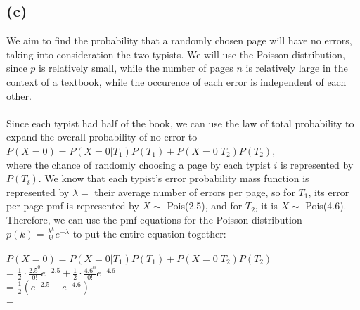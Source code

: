 \documentclass{article}
\begin{document}
{\subsection*{(c)}
We aim to find the probability that a randomly chosen page will have no errors, taking into consideration the two typists. We will use the Poisson distribution, since $p$ is relatively small, while the number of pages $n$ is relatively large in the context of a textbook, while the occurence of each error is independent of each other. \\ \\ 
Since each typist had half of the book, we can use the law of total probability to expand the overall probability of no error to \\ 
$P(X = 0) = P(X = 0 | T_1)P(T_1) + P(X = 0 | T_2)P(T_2)$, \\  where the chance of randomly choosing a page by each typist $i$ is represented by $P(T_i)$. We know that each typist's error probability mass function is represented by $\lambda = $ their average number of errors per page, so for $T_1$, its error per page pmf is represented by $X \sim $ Pois(2.5), and for $T_2$, it is $X \sim $ Pois(4.6). Therefore, we can use the pmf equations for the Poisson distribution $p(k) = \frac{\lambda^k}{k!}e^{-\lambda}$ to put the entire equation together: \\ \\ 
$P(X = 0) = P(X = 0 | T_1)P(T_1) + P(X = 0 | T_2)P(T_2)$ \\ 
= $\frac{1}{2} \cdot \frac{2.5^0}{0!}e^{-2.5} + \frac{1}{2} \cdot \frac{4.6^0}{0!}e^{-4.6}$ \\ 
= $\frac{1}{2}(e^{-2.5} + e^{-4.6})$ \\ 
= 


}
\end{document}
